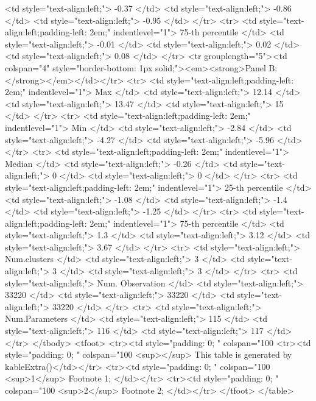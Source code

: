    <td style="text-align:left;"> -0.37 </td>
   <td style="text-align:left;"> -0.86 </td>
   <td style="text-align:left;"> -0.95 </td>
  </tr>
  <tr>
   <td style="text-align:left;padding-left: 2em;" indentlevel="1"> 75-th percentile </td>
   <td style="text-align:left;"> -0.01 </td>
   <td style="text-align:left;"> 0.02 </td>
   <td style="text-align:left;"> 0.08 </td>
  </tr>
  <tr grouplength="5"><td colspan="4" style="border-bottom: 1px solid;"><em><strong>Panel B: </strong></em></td></tr>
<tr>
   <td style="text-align:left;padding-left: 2em;" indentlevel="1"> Max </td>
   <td style="text-align:left;"> 12.14 </td>
   <td style="text-align:left;"> 13.47 </td>
   <td style="text-align:left;"> 15 </td>
  </tr>
  <tr>
   <td style="text-align:left;padding-left: 2em;" indentlevel="1"> Min </td>
   <td style="text-align:left;"> -2.84 </td>
   <td style="text-align:left;"> -4.27 </td>
   <td style="text-align:left;"> -5.96 </td>
  </tr>
  <tr>
   <td style="text-align:left;padding-left: 2em;" indentlevel="1"> Median </td>
   <td style="text-align:left;"> -0.26 </td>
   <td style="text-align:left;"> 0 </td>
   <td style="text-align:left;"> 0 </td>
  </tr>
  <tr>
   <td style="text-align:left;padding-left: 2em;" indentlevel="1"> 25-th percentile </td>
   <td style="text-align:left;"> -1.08 </td>
   <td style="text-align:left;"> -1.4 </td>
   <td style="text-align:left;"> -1.25 </td>
  </tr>
  <tr>
   <td style="text-align:left;padding-left: 2em;" indentlevel="1"> 75-th percentile </td>
   <td style="text-align:left;"> 1.3 </td>
   <td style="text-align:left;"> 3.12 </td>
   <td style="text-align:left;"> 3.67 </td>
  </tr>
  <tr>
   <td style="text-align:left;"> Num.clusters </td>
   <td style="text-align:left;"> 3 </td>
   <td style="text-align:left;"> 3 </td>
   <td style="text-align:left;"> 3 </td>
  </tr>
  <tr>
   <td style="text-align:left;"> Num. Observation </td>
   <td style="text-align:left;"> 33220 </td>
   <td style="text-align:left;"> 33220 </td>
   <td style="text-align:left;"> 33220 </td>
  </tr>
  <tr>
   <td style="text-align:left;"> Num.Parameters </td>
   <td style="text-align:left;"> 115 </td>
   <td style="text-align:left;"> 116 </td>
   <td style="text-align:left;"> 117 </td>
  </tr>
</tbody>
<tfoot>
<tr><td style="padding: 0; " colspan="100%
<tr><td style="padding: 0; " colspan="100%
<sup></sup> This table is generated by kableExtra()</td></tr>
<tr><td style="padding: 0; " colspan="100%
<sup>1</sup> Footnote 1; </td></tr>
<tr><td style="padding: 0; " colspan="100%
<sup>2</sup> Footnote 2; </td></tr>
</tfoot>
</table>
